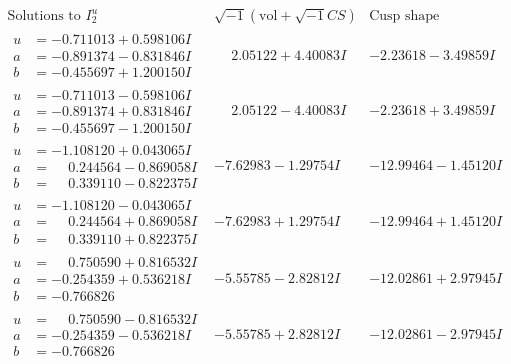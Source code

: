 \documentclass[1p]{elsarticle_modified}
\theoremstyle{definition}
\newcommand{\I}{\sqrt{-1}}
\begin{document}
$$\begin{array}{c|c|c}  
\text{Solutions to }I^u_{2}& \I (\text{vol} + \sqrt{-1}CS) & \text{Cusp shape}\\
 \hline 
\begin{aligned}
u &= -0.711013 + 0.598106 I \\
a &= -0.891374 - 0.831846 I \\
b &= -0.455697 + 1.200150 I\end{aligned}
 & \phantom{-}2.05122 + 4.40083 I & -2.23618 - 3.49859 I \\ \hline\begin{aligned}
u &= -0.711013 - 0.598106 I \\
a &= -0.891374 + 0.831846 I \\
b &= -0.455697 - 1.200150 I\end{aligned}
 & \phantom{-}2.05122 - 4.40083 I & -2.23618 + 3.49859 I \\ \hline\begin{aligned}
u &= -1.108120 + 0.043065 I \\
a &= \phantom{-}0.244564 - 0.869058 I \\
b &= \phantom{-}0.339110 - 0.822375 I\end{aligned}
 & -7.62983 - 1.29754 I & -12.99464 - 1.45120 I \\ \hline\begin{aligned}
u &= -1.108120 - 0.043065 I \\
a &= \phantom{-}0.244564 + 0.869058 I \\
b &= \phantom{-}0.339110 + 0.822375 I\end{aligned}
 & -7.62983 + 1.29754 I & -12.99464 + 1.45120 I \\ \hline\begin{aligned}
u &= \phantom{-}0.750590 + 0.816532 I \\
a &= -0.254359 + 0.536218 I \\
b &= -0.766826\phantom{ +0.000000I}\end{aligned}
 & -5.55785 - 2.82812 I & -12.02861 + 2.97945 I \\ \hline\begin{aligned}
u &= \phantom{-}0.750590 - 0.816532 I \\
a &= -0.254359 - 0.536218 I \\
b &= -0.766826\phantom{ +0.000000I}\end{aligned}
 & -5.55785 + 2.82812 I & -12.02861 - 2.97945 I \\ \hline\begin{aligned}

\end{aligned}
\end{array}$$
\end{document}
